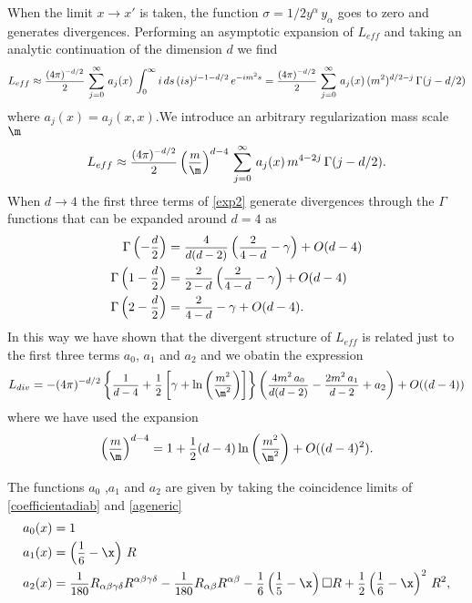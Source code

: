 \documentclass[a4paper,11pt,openright,twoside]{book}
\let\a=\alpha   \let\b=\beta   \let\g=\gamma   \let\d=\delta
\let\G=\Gamma  \let\D=\Delta \let\Q=\Theta  \let\L=\Lambda
\newcommand{\sdfrac}[2]{\mbox{\small$\displaystyle\frac{#1}{#2}$}}
\numberwithin{equation}{section}
\begin{document}
{{{	When the limit $x\to x'$ is taken, the function  $\sigma=1/2y^\alpha\,y_\alpha$ goes to zero and generates divergences. Performing an asymptotic expansion of $L_{eff}$ and taking an analytic continuation of the dimension $d$ we find
	\begin{equation}
		L_{eff}\approx \sdfrac{(4\pi)^{-d/2}}{2}\,\sum_{j=0}^\infty\,a_j(x)\,\int_0^\infty i\,ds\,(is)^{j-1-d/2}\,e^{-im^2s}=\sdfrac{(4\pi)^{-d/2}}{2}\,\sum_{j=0}^\infty\,a_j(x)\,(m^2)^{d/2-j}\,\G(j-d/2)\label{expL}
	\end{equation}
	where $a_j(x)=a_j(x,x)$.We introduce an arbitrary regularization mass scale $\m$ \begin{equation}
		L_{eff}\approx \sdfrac{(4\pi)^{-d/2}}{2}\left(\sdfrac{m}{\m}\right)^{d-4}\,\sum_{j=0}^\infty\,a_j(x)\,m^{4-2j}\,\G(j-d/2).\label{exp2}
	\end{equation}
	When $d\to 4$ the first three terms of \eqref{exp2} generate divergences through the $\G$ functions that can be expanded around $d=4$ as 
	\begin{equation}
		\begin{split}
			\G\left(-\sdfrac{d}{2}\right)&=\sdfrac{4}{d(d-2)}\left(\sdfrac{2}{4-d}-\g\right)+O(d-4)\\
			\G\left(1-\sdfrac{d}{2}\right)&=\sdfrac{2}{2-d}\left(\sdfrac{2}{4-d}-\g\right)+O(d-4)\\
			\G\left(2-\sdfrac{d}{2}\right)&=\sdfrac{2}{4-d}-\g+O(d-4).
		\end{split}\label{gamma}
	\end{equation}
	In this way we have shown that the divergent structure of $L_{eff}$ is related just to the first three terms $a_0$, $a_1$ and $a_2$ and we obatin the expression
	\begin{equation}
		L_{div}=-(4\pi)^{-d/2}\left\{\sdfrac{1}{d-4}+\sdfrac{1}{2}\left[\g+\ln\left(\sdfrac{m^2}{\m^2}\right)\right]\right\}\left(\sdfrac{4m^2\,a_0}{d(d-2)}-\sdfrac{2m^2\,a_1}{d-2}+a_2\right)\label{exp3}+O((d-4))
	\end{equation}
	where we have used the expansion
	\begin{equation}
		\left(\sdfrac{m}{\m}\right)^{d-4}=1+\sdfrac{1}{2}(d-4)\ln\left(\sdfrac{m^2}{\m^2}\right)+O((d-4)^2).
	\end{equation}
	
	The functions $a_0$ ,$a_1$ and $a_2$ are given by taking the coincidence limits of \eqref{coefficientadiab} and \eqref{ageneric}
	\begin{align}
		a_0(x)&=1\\
		a_1(x)&=\left(\sdfrac{1}{6}-\x\right)\,R\\
		a_2(x)&=\sdfrac{1}{180}R_{\a\b\g\d}R^{\a\b\g\d}-\sdfrac{1}{180}R_{\a\b}R^{\a\b}-\sdfrac{1}{6}\left(\sdfrac{1}{5}-\x\right)\square R+\sdfrac{1}{2}\left(\sdfrac{1}{6}-\x\right)^2\,R^2,\label{a2}
	\end{align}
	
}}}
\end{document}
